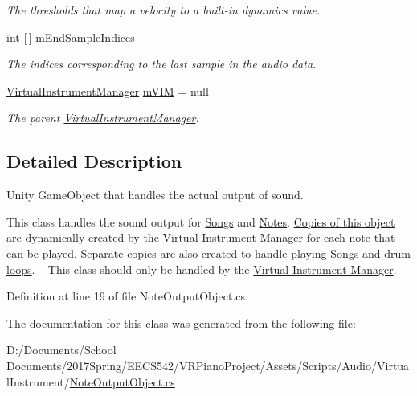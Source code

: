 \begin{DoxyCompactItemize}
\begin{DoxyCompactList}\small\item\em The thresholds that map a velocity to a built-\/in dynamics value. \end{DoxyCompactList}\item 
int \mbox{[}$\,$\mbox{]} \hyperlink{group___n_o_o_priv_var_ga48c676306790f40714072cd6a81a0128}{m\+End\+Sample\+Indices}
\begin{DoxyCompactList}\small\item\em The indices corresponding to the last sample in the audio data. \end{DoxyCompactList}\item 
\hyperlink{class_virtual_instrument_manager}{Virtual\+Instrument\+Manager} \hyperlink{group___n_o_o_priv_var_ga61394090fddcb90c67bf68f19a5bfb6e}{m\+V\+IM} = null
\begin{DoxyCompactList}\small\item\em The parent \hyperlink{class_virtual_instrument_manager}{Virtual\+Instrument\+Manager}. \end{DoxyCompactList}\end{DoxyCompactItemize}


\subsection{Detailed Description}
Unity Game\+Object that handles the actual output of sound. 

This class handles the sound output for \hyperlink{class_song}{Songs} and \hyperlink{group___v_i_m_event_types_class_virtual_instrument_manager_1_1_play_note_event}{Notes}. \hyperlink{group___v_i_m_priv_ga53f837fd01475fa35629a650e7fa00e3}{Copies of this object} are \hyperlink{group___v_i_m_priv_func_ga8817e32cc5074737b4d9489922b0fcb8}{dynamically created} by the \hyperlink{group___v_i_m}{Virtual Instrument Manager} for each \hyperlink{group___v_i_m_priv_ga5cedf9995d59b416412677e6004b659c}{note that can be played}. Separate copies are also created to \hyperlink{group___v_i_m_priv_gaa8d4f5642f5ac4dca4f4178b0052c78d}{handle playing Songs} and \hyperlink{group___v_i_m_priv_ga5f71cb71d240042312dcc13b481b068d}{drum loops}. ~\newline
 This class should only be handled by the \hyperlink{group___v_i_m}{Virtual Instrument Manager}. 

Definition at line 19 of file Note\+Output\+Object.\+cs.



The documentation for this class was generated from the following file\+:\begin{DoxyCompactItemize}
\item 
D\+:/\+Documents/\+School Documents/2017\+Spring/\+E\+E\+C\+S542/\+V\+R\+Piano\+Project/\+Assets/\+Scripts/\+Audio/\+Virtual\+Instrument/\hyperlink{_note_output_object_8cs}{Note\+Output\+Object.\+cs}\end{DoxyCompactItemize}
